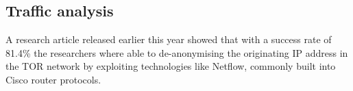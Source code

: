 \subsection{Traffic analysis}
A research article released earlier this year showed that with a success rate of 81.4\% the researchers where able to de-anonymising the originating IP address in the TOR network by exploiting technologies like Netflow, commonly built into Cisco router protocols.~\cite{torrouter}~\cite{traffic_analysis}


